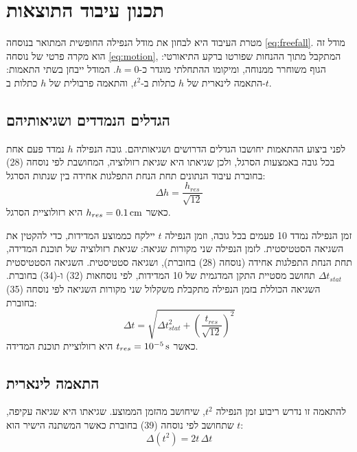 \documentclass[10pt,a4paper]{article}
\newcommand{\U}[1]{\,\mathrm{#1}}
\begin{document}
\section*{תכנון עיבוד התוצאות}
מטרת העיבוד היא לבחון את מודל הנפילה החופשית המתואר בנוסחה \eqref{eq:freefall}. מודל זה הוא מקרה פרטי של נוסחה \eqref{eq:motion}, המתקבל מתוך ההנחות שפורטו ברקע התיאורטי: הגוף משוחרר ממנוחה, ומיקומו ההתחלתי מוגדר כ-$h=0$.
המודל ייבחן בשתי התאמות: התאמה לינארית של $h$ כתלות ב-$t^2$, והתאמה פרבולית של $h$ כתלות ב-$t$.

\subsection*{הגדלים הנמדדים ושגיאותיהם}
לפני ביצוע ההתאמות יחושבו הגדלים הדרושים ושגיאותיהם.
גובה הנפילה $h$ נמדד פעם אחת בכל גובה באמצעות הסרגל, ולכן שגיאתו היא שגיאת רזולוציה, המחושבת לפי נוסחה (28) בחוברת עיבוד הנתונים תחת הנחת התפלגות אחידה בין שנתות הסרגל:
\begin{equation}\label{eq:dh}
\Delta h = \frac{h_{res}}{\sqrt{12}}
\end{equation}
כאשר $h_{res} = \HRes\U{cm}$ היא רזולוציית הסרגל.

זמן הנפילה נמדד 10 פעמים בכל גובה, וזמן הנפילה $t$ יילקח כממוצע המדידות, כדי להקטין את השגיאה הסטטיסטית. לזמן הנפילה שני מקורות שגיאה: שגיאת רזולוציה של תוכנת המדידה, תחת הנחת התפלגות אחידה (נוסחה (28) בחוברת), ושגיאה סטטיסטית.
השגיאה הסטטיסטית $\Delta t_{stat}$ תחושב מסטיית התקן המדגמית של 10 המדידות, לפי נוסחאות (32) ו-(34) בחוברת.
השגיאה הכוללת בזמן הנפילה מתקבלת משקלול שני מקורות השגיאה לפי נוסחה (35) בחוברת:
\begin{equation}\label{eq:dt}
\Delta t = \sqrt{\Delta t_{stat}^2 + \left(\frac{t_{res}}{\sqrt{12}}\right)^2}
\end{equation}
כאשר $t_{res} = \TRes\U{s}$ היא רזולוציית תוכנת המדידה.

\subsection*{התאמה לינארית}
להתאמה זו נדרש ריבוע זמן הנפילה $t^2$, שיחושב מהזמן הממוצע. שגיאתו היא שגיאה עקיפה, שתחושב לפי נוסחה (39) בחוברת כאשר המשתנה הישיר הוא $t$:
\begin{equation}\label{eq:dt2}
\Delta(t^2) = 2t\,\Delta t
\end{equation}
\end{document}
